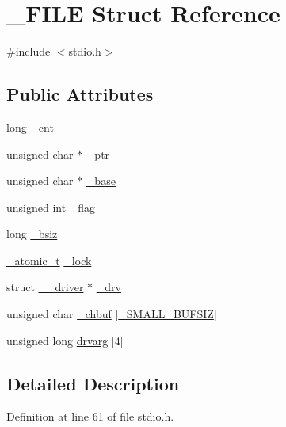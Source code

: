 \hypertarget{struct__FILE}{}\section{\+\_\+\+F\+I\+LE Struct Reference}
\label{struct__FILE}


{\ttfamily \#include $<$stdio.\+h$>$}

\subsection*{Public Attributes}
\begin{DoxyCompactItemize}
\item 
long \mbox{\hyperlink{struct__FILE_aaaf4216b278e7aaea0486fbdd6c7a64a}{\+\_\+cnt}}
\item 
unsigned char $\ast$ \mbox{\hyperlink{struct__FILE_a520588e16163f7573f4f2bcd6e73e531}{\+\_\+ptr}}
\item 
unsigned char $\ast$ \mbox{\hyperlink{struct__FILE_a2152494c67eaf2520f2cbc54270f1a3c}{\+\_\+base}}
\item 
unsigned int \mbox{\hyperlink{struct__FILE_a571db8b3c19efbcea436c6db6f6c963f}{\+\_\+flag}}
\item 
long \mbox{\hyperlink{struct__FILE_a8047f6ae39aaa27b30d06ba49dd31951}{\+\_\+bsiz}}
\item 
\mbox{\hyperlink{thread_8h_a6743820c6e04c49e472e7cbeded2f83f}{\+\_\+atomic\+\_\+t}} \mbox{\hyperlink{struct__FILE_a423c5224e09d8aac0b1d3b96a945df10}{\+\_\+lock}}
\item 
struct \mbox{\hyperlink{struct____driver}{\+\_\+\+\_\+driver}} $\ast$ \mbox{\hyperlink{struct__FILE_a45e9603683edd1760f891ab11c2f9d3f}{\+\_\+drv}}
\item 
unsigned char \mbox{\hyperlink{struct__FILE_ac2c8e185d05c6a5cf9835376d206d0af}{\+\_\+chbuf}} \mbox{[}\mbox{\hyperlink{stdio_8h_a9a061eceee5e1799e31f1c8419f57f2c}{\+\_\+\+S\+M\+A\+L\+L\+\_\+\+B\+U\+F\+S\+IZ}}\mbox{]}
\item 
unsigned long \mbox{\hyperlink{struct__FILE_ad5c3b4d5c9039aee527eab7244b697b7}{drvarg}} \mbox{[}4\mbox{]}
\end{DoxyCompactItemize}


\subsection{Detailed Description}


Definition at line 61 of file stdio.\+h.




